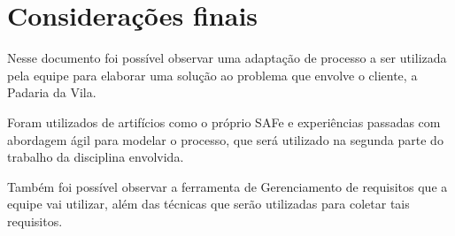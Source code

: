 \chapter{Considerações finais}

Nesse documento foi possível observar uma adaptação de processo a ser utilizada pela equipe para elaborar uma solução ao problema que envolve o cliente, a Padaria da Vila.

Foram utilizados de artifícios como o próprio SAFe e experiências passadas com abordagem ágil para modelar o processo, que será utilizado na segunda parte do trabalho da disciplina envolvida.

Também foi possível observar a ferramenta de Gerenciamento de requisitos que a equipe vai utilizar, além das técnicas que serão utilizadas para coletar tais requisitos.